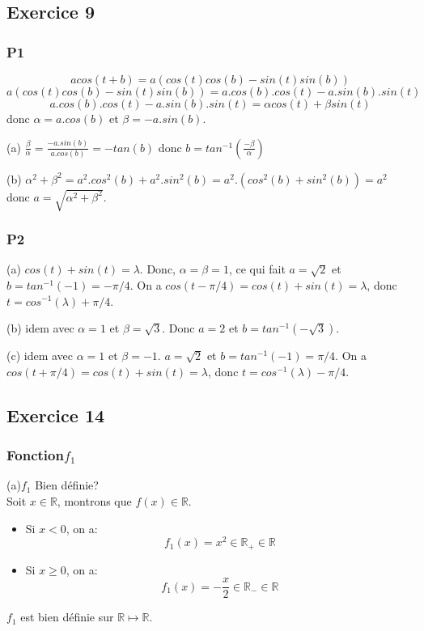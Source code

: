 \documentclass[]{book}
\theoremstyle{definition}
\newcommand{\bb}[1]{\mathbb{#1}}
\newcommand{\R}{\bb{R}}
\begin{document}
  
\subsection*{Exercice 9}
\subsubsection*{P1}
$$acos(t+b) = a(cos(t)cos(b)-sin(t)sin(b))$$ 
$$a(cos(t)cos(b)-sin(t)sin(b)) = a.cos(b).cos(t) - a.sin(b).sin(t)$$
$$a.cos(b).cos(t) - a.sin(b).sin(t) = \alpha cos(t) + \beta sin(t)$$ 
donc $\alpha = a.cos(b)$ et $\beta=-a.sin(b)$. 

(a) $\frac{\beta}{\alpha} = \frac{-a.sin(b)}{a.cos(b)} = -tan(b)$ donc $b=tan^{-1}(\frac{-\beta}{\alpha})$


(b) $\alpha^2 + \beta^2 = a^2.cos^2(b) + a^2.sin^2(b) = a^2.(cos^2(b) + sin^2(b)) = a^2$ donc $a=\sqrt{\alpha^2 + \beta^2}$.

\subsubsection*{P2}
(a) $cos(t) + sin(t) = \lambda$. Donc, $\alpha = \beta = 1$, ce qui fait $a = \sqrt{2}$ et $b=tan^{-1}(-1)=-\pi/4$. On a $cos(t-\pi/4) = cos(t) + sin(t) = \lambda$, donc $t=cos^{-1}(\lambda)+\pi/4$.


(b) idem avec $\alpha = 1$ et $\beta = \sqrt{3}$. Donc $a=2$ et $b=tan^{-1}(-\sqrt{3})$.

(c) idem avec $\alpha = 1$ et $\beta = -1$. $a = \sqrt{2}$ et $b=tan^{-1}(-1)=\pi/4$. On a $cos(t+\pi/4) = cos(t) + sin(t) = \lambda$, donc $t=cos^{-1}(\lambda)-\pi/4$.

\subsection*{Exercice 14}
\subsubsection*{Fonction$f_1$}
(a)$f_1$ Bien d\'efinie?\\
Soit $x \in \R$, montrons que $f(x) \in \R$.
\begin{itemize}
\item Si $x < 0$, on a: 
$$ f_1(x) = x^2 \in \R_{+} \in \R$$
\item Si $x \ge 0$, on a:
$$f_1(x) = -\frac{x}{2} \in \R_{-} \in \R$$
\end{itemize}
$f_1$ est bien d\'efinie sur $\R \mapsto \R$.
\end{document}
